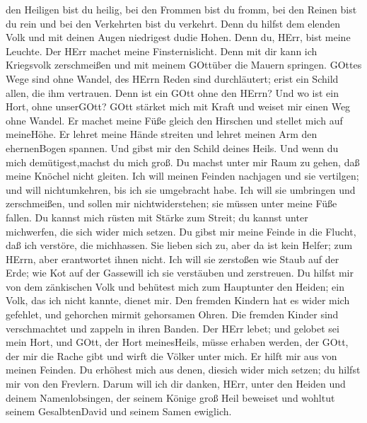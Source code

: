 den Heiligen bist du heilig, bei den Frommen bist du fromm,
 bei den Reinen bist du rein und bei den Verkehrten bist du
verkehrt.  Denn du hilfst dem elenden Volk und mit deinen
Augen niedrigest dudie Hohen.  Denn du, HErr, bist meine
Leuchte. Der HErr machet meine Finsternislicht.  Denn mit
dir kann ich Kriegsvolk zerschmeißen und mit meinem GOttüber die Mauern
springen.  GOttes Wege sind ohne Wandel, des HErrn Reden
sind durchläutert; erist ein Schild allen, die ihm vertrauen.
 Denn ist ein GOtt ohne den HErrn? Und wo ist ein Hort,
ohne unserGOtt?  GOtt stärket mich mit Kraft und weiset mir
einen Weg ohne Wandel.  Er machet meine Füße gleich den
Hirschen und stellet mich auf meineHöhe.  Er lehret meine
Hände streiten und lehret meinen Arm den ehernenBogen spannen.
 Und gibst mir den Schild deines Heils. Und wenn du mich
demütigest,machst du mich groß.  Du machst unter mir Raum
zu gehen, daß meine Knöchel nicht gleiten.  Ich will meinen
Feinden nachjagen und sie vertilgen; und will nichtumkehren, bis ich sie
umgebracht habe.  Ich will sie umbringen und zerschmeißen,
und sollen mir nichtwiderstehen; sie müssen unter meine Füße fallen.
 Du kannst mich rüsten mit Stärke zum Streit; du kannst
unter michwerfen, die sich wider mich setzen.  Du gibst mir
meine Feinde in die Flucht, daß ich verstöre, die michhassen.
 Sie lieben sich zu, aber da ist kein Helfer; zum HErrn,
aber erantwortet ihnen nicht.  Ich will sie zerstoßen wie
Staub auf der Erde; wie Kot auf der Gassewill ich sie verstäuben und
zerstreuen.  Du hilfst mir von dem zänkischen Volk und
behütest mich zum Hauptunter den Heiden; ein Volk, das ich nicht kannte,
dienet mir.  Den fremden Kindern hat es wider mich
gefehlet, und gehorchen mirmit gehorsamen Ohren.  Die
fremden Kinder sind verschmachtet und zappeln in ihren Banden.
 Der HErr lebet; und gelobet sei mein Hort, und GOtt, der
Hort meinesHeils, müsse erhaben werden,  der GOtt, der mir
die Rache gibt und wirft die Völker unter mich.  Er hilft
mir aus von meinen Feinden. Du erhöhest mich aus denen, diesich wider
mich setzen; du hilfst mir von den Frevlern.  Darum will
ich dir danken, HErr, unter den Heiden und deinem Namenlobsingen,
 der seinem Könige groß Heil beweiset und wohltut seinem
GesalbtenDavid und seinem Samen ewiglich.

